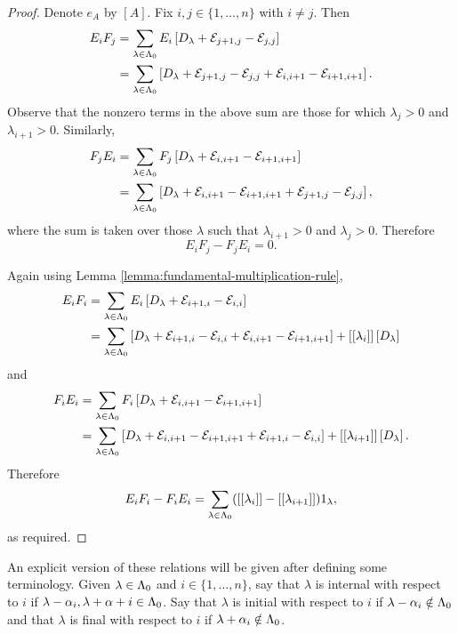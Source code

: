 \documentclass[a4paper, 11pt]{report}
\begin{document}
\begin{proof}
Denote $e_A$ by $\left[A\right]$. Fix $i,j\in\{1,\ldots,n\}$ with $i\neq j$. Then
\begin{align*}
E_i F_j &= \sum_{\lambda\in\Lambda_0{}} E_i\left[D_{\lambda} +\mathcal{E}_{j+1,j} -\mathcal{E}_{j,j}\right]\\
&= \sum_{\lambda\in\Lambda_0{}} \left[D_{\lambda} +\mathcal{E}_{j+1,j} -\mathcal{E}_{j,j} +\mathcal{E}_{i,i+1} -\mathcal{E}_{i+1,i+1}\right].
\end{align*}
Observe that the nonzero terms in the above sum are those for which $\lambda_j>0$ and $\lambda_{i+1}>0$. Similarly,
\begin{align*}
F_jE_i &= \sum_{\lambda\in\Lambda_0{}} F_j\left[D_{\lambda} +\mathcal{E}_{i,i+1} -\mathcal{E}_{i+1,i+1}\right]\\
&= \sum_{\lambda\in\Lambda_0{}} \left[D_{\lambda} +\mathcal{E}_{i,i+1} -\mathcal{E}_{i+1,i+1} +\mathcal{E}_{j+1,j} -\mathcal{E}_{j,j}\right],
\end{align*}
where the sum is taken over those $\lambda$ such that $\lambda_{i+1}>0$ and $\lambda_{j}>0$. Therefore
\begin{equation*}
E_iF_j -F_jE_i = 0.
\end{equation*}

Again using Lemma \ref{lemma:fundamental-multiplication-rule},
\begin{align*}
E_iF_i &= \sum_{\lambda\in\Lambda_0{}} E_i\left[D_{\lambda} +\mathcal{E}_{i+1,i} -\mathcal{E}_{i,i}\right]\\
&= \sum_{\lambda\in\Lambda_0{}} \left[D_{\lambda} +\mathcal{E}_{i+1,i} -\mathcal{E}_{i,i} +\mathcal{E}_{i,i+1} -\mathcal{E}_{i+1,i+1}\right] + [[\lambda_i]]\left[D_{\lambda}\right]
\end{align*}
and
\begin{align*}
F_iE_i &= \sum_{\lambda\in\Lambda_0{}} F_i\left[D_{\lambda} +\mathcal{E}_{i,i+1} -\mathcal{E}_{i+1,i+1}\right]\\
&= \sum_{\lambda\in\Lambda_0{}} \left[D_{\lambda} +\mathcal{E}_{i,i+1} -\mathcal{E}_{i+1,i+1} +\mathcal{E}_{i+1,i} -\mathcal{E}_{i,i}\right] + [[\lambda_{i+1}]]\left[D_{\lambda}\right].
\end{align*}
Therefore
\begin{equation*}
E_iF_i -F_iE_i = \sum_{\lambda\in\Lambda_0{}} ([[\lambda_i]] -[[\lambda_{i+1}]])1_\lambda,
\end{equation*}
as required.
\end{proof}

An explicit version of these relations will be given after defining some terminology. Given $\lambda\in\Lambda_0{}$ and $i\in\{1,\ldots,n\}$, say that $\lambda$ is internal with respect to $i$ if $\lambda-\alpha_i,\lambda+\alpha+i\in\Lambda_0{}$. Say that $\lambda$ is initial with respect to $i$ if $\lambda-\alpha_i\notin\Lambda_0{}$ and that $\lambda$ is final with respect to $i$ if $\lambda+\alpha_i\notin\Lambda_0{}$.
\end{document}
